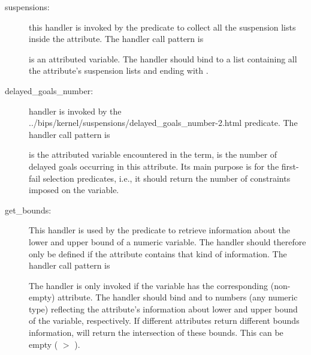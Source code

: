 \begin{description}
\item [suspensions:]
  this handler is invoked by the
 predicate
to collect all the suspension lists inside the attribute.
The handler call pattern is
\begin{quote}
\end{quote}
 is an attributed variable. The handler should bind
 to a list containing all the attribute's
suspension lists and ending with .


\item [delayed_goals_number:]
  handler is invoked by the
%
{../bips/kernel/suspensions/delayed_goals_number-2.html}
predicate.
The handler call pattern is
\begin{quote}
\end{quote}
 is the attributed variable encountered in the
term,  is the number of delayed
goals occurring in this attribute.
Its main purpose is for the first-fail selection predicates,
i.e., it should return the number of constraints imposed on
the variable.

\item [get_bounds:]
    This handler is used by the predicate
    to retrieve information about the lower and upper bound of a numeric
    variable.
    The handler should therefore only be defined if the attribute contains
    that kind of information. The handler call pattern is
    \begin{quote}
    \end{quote}
    The handler is only invoked if the variable has the corresponding
    (non-empty) attribute.
    The handler should bind  and  to numbers
    (any numeric type) reflecting the attribute's information about lower
    and upper bound of the variable, respectively.
    If different attributes return different bounds information,
    will return the intersection of these bounds. This can be empty
    ( $>$ ).


\end{description}
